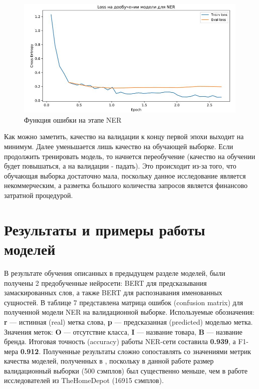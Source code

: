 \documentclass[12pt,a4paper]{article}
\begin{document}
\begin{figure}[H]
	\begin{center}
		\includegraphics[scale=0.4]{loss_ner.jpg}
	\end{center}
	\caption{Функция ошибки на этапе NER}
\end{figure}

\noindent Как можно заметить, качество на валидации к концу первой эпохи выходит на минимум. Далее уменьшается лишь качество на обучающей выборке. Если продолжить тренировать модель, то начнется переобучение (качество на обучении будет повышаться, а на валидации - падать). Это происходит из-за того, что обучающая выборка достаточно мала, поскольку данное исследование является некоммерческим, а разметка большого количества запросов является финансово затратной процедурой.

\section{Результаты и примеры работы моделей}

В результате обучения описанных в предыдущем разделе моделей, были получены 2 предобученные нейросети: BERT для предсказывания замаскированных слов, а также BERT для распознавания именованных сущностей. В таблице 7 представлена матрица ошибок (confusion matrix) для полученной модели NER на валидационной выборке. Используемые обозначения: \textbf{r} --- истинная (real) метка слова, \textbf{p} --- предсказанная (predicted) моделью метка. Значения меток: \textbf{O} --- отсутствие класса, \textbf{I} --- название товара, \textbf{B} --- название бренда. Итоговая точность (accuracy) работы NER-сети составила \textbf{0.939}, а F1-мера \textbf{0.912}. Полученные результаты сложно сопоставлять со значениями метрик качества моделей, полученных в \cite{ner}, поскольку в данной работе размер валидационный выборки (500 сэмплов) был существенно меньше, чем в работе исследователей из TheHomeDepot (16915 сэмплов).
\end{document}
